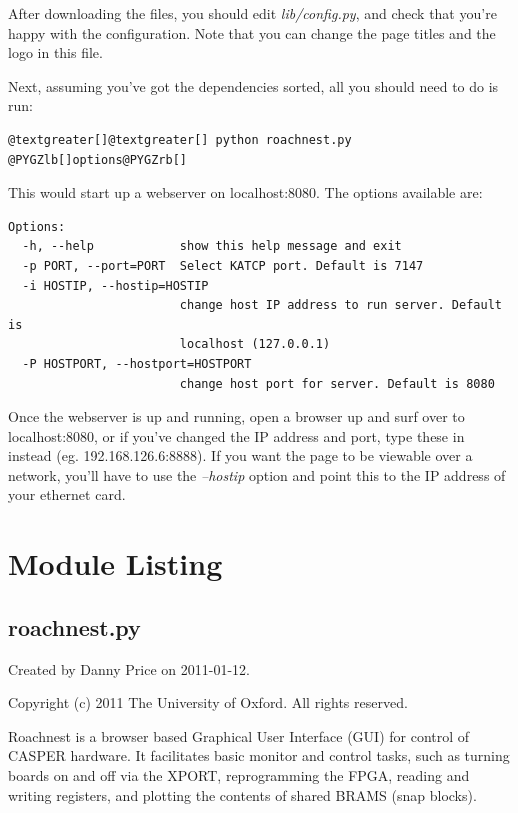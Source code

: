 \documentclass[letterpaper,10pt,english]{sphinxmanual}
\begin{document}
After downloading the files, you should edit \emph{lib/config.py}, and check
that you're happy with the configuration. Note that you can change the page titles and the logo
in this file.

Next, assuming you've got the dependencies sorted, all you should need to do is run:

\begin{Verbatim}[commandchars=@\[\]]
@textgreater[]@textgreater[] python roachnest.py  @PYGZlb[]options@PYGZrb[]
\end{Verbatim}

This would start up a webserver on localhost:8080. The options available are:

\begin{Verbatim}[commandchars=@\[\]]
Options:
  -h, --help            show this help message and exit
  -p PORT, --port=PORT  Select KATCP port. Default is 7147
  -i HOSTIP, --hostip=HOSTIP
                        change host IP address to run server. Default is
                        localhost (127.0.0.1)
  -P HOSTPORT, --hostport=HOSTPORT
                        change host port for server. Default is 8080
\end{Verbatim}

Once the webserver is up and running, open a browser up and surf over to localhost:8080, or if you've changed
the IP address and port, type these in instead (eg. 192.168.126.6:8888). If you want the page to be viewable
over a network, you'll have to use the \emph{--hostip} option and point this to the IP address of your ethernet card.


\chapter{Module Listing}
\label{index:module-listing}\label{index:module-roachnest}

\section{roachnest.py}
\label{index:roachnest-py}
Created by Danny Price on 2011-01-12.

Copyright (c) 2011 The University of Oxford. All rights reserved.

Roachnest is a browser based Graphical User Interface (GUI) for control of CASPER hardware.
It facilitates basic monitor and control tasks, such as turning boards on and off via the XPORT, 
reprogramming the FPGA, reading and writing registers, and plotting the contents of shared BRAMS 
(snap blocks).
\end{document}
